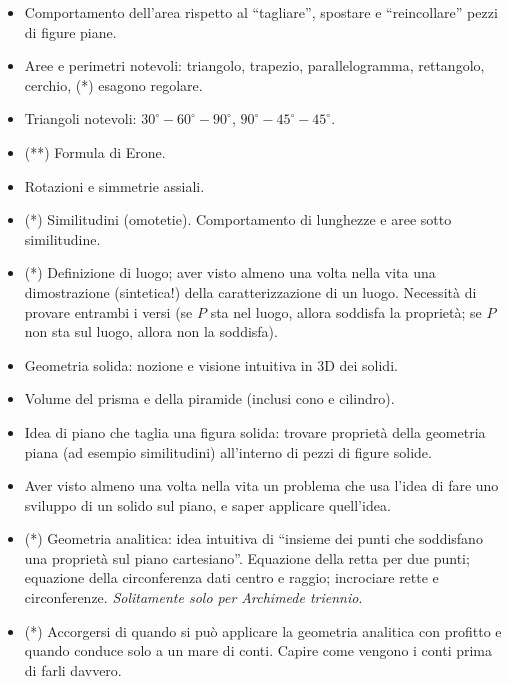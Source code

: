 \documentclass[a4paper,10pt]{paper}
\renewcommand{\star}{(*)}
\newcommand{\sstar}{(**)}
\begin{document}
\begin{itemize}
 \item Comportamento dell'area rispetto al ``tagliare'', spostare e ``reincollare'' pezzi di figure piane.
 \item Aree e perimetri notevoli: triangolo, trapezio, parallelogramma, rettangolo, cerchio, \star{} esagono regolare.
 \item Triangoli notevoli: $30^\circ-60^\circ-90^\circ$, $90^\circ-45^\circ-45^\circ$.
 \item \sstar{} Formula di Erone.
 \item Rotazioni e simmetrie assiali.
 \item \star{} Similitudini (omotetie). Comportamento di lunghezze e aree sotto similitudine.
 \item \star{} Definizione di luogo; aver visto almeno una volta nella vita una dimostrazione (sintetica!) della caratterizzazione di un luogo. Necessità di provare entrambi i versi (se $P$ sta nel luogo, allora soddisfa la proprietà; se $P$ non sta sul luogo, allora non la soddisfa).
 \item Geometria solida: nozione e visione intuitiva in 3D dei solidi.
 \item  Volume del prisma e della piramide (inclusi cono e cilindro).
 \item Idea di piano che taglia una figura solida: trovare proprietà della geometria piana (ad esempio similitudini) all'interno di pezzi di figure solide.
 \item Aver visto almeno una volta nella vita un problema che usa l'idea di fare uno sviluppo di un solido sul piano, e saper applicare quell'idea.
 \item \star{} Geometria analitica: idea intuitiva di ``insieme dei punti che soddisfano una proprietà sul piano cartesiano''. Equazione della retta per due punti; equazione della circonferenza dati centro e raggio; incrociare rette e circonferenze. \emph{Solitamente solo per Archimede triennio}.
 \item \star{} Accorgersi di quando si può applicare la geometria analitica con profitto e quando conduce solo a un mare di conti. Capire come vengono i conti prima di farli davvero.
\end{itemize}
\end{document}
